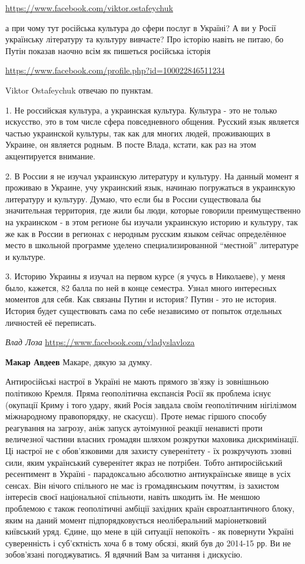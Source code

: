\begin{itemize}

\url{https://www.facebook.com/viktor.ostafeychuk}

а при чому тут російська культура до сфери послуг в Україні? А ви у Росії
українську літературу та культуру вивчаєте? Про історію навіть не питаю, бо
Путін показав наочно всім як пишеться російська історія

\url{https://www.facebook.com/profile.php?id=100022846511234}

Viktor Ostafeychuk отвечаю по пунктам.

1. Не российская культура, а украинская культура. Культура - это не только
искусство, это в том числе сфера повседневного общения. Русский язык является
частью украинской культуры, так как для многих людей, проживающих в Украине, он
является родным. В посте Влада, кстати, как раз на этом акцентируется внимание.

2. В России я не изучал украинскую литературу и культуру. На данный момент я
проживаю в Украине, учу украинский язык, начинаю погружаться в украинскую
литературу и культуру. Думаю, что если бы в России существовала бы значительная
территория, где жили бы люди, которые говорили преимущественно на украинском -
в этом регионе бы изучали украинскую историю и культуру, так же как в России в
регионах с неродным русским языком сейчас определённое место в школьной
программе уделено специализированной \enquote{местной} литературе и культуре.

3. Историю Украины я изучал на первом курсе (я учусь в Николаеве), у меня было,
кажется, 82 балла по ней в конце семестра. Узнал много интересных моментов для
себя. Как связаны Путин и история? Путин - это не история. История будет
существовать сама по себе независимо от попыток отдельных личностей её
переписать.

\emph{Влад Лоза}
\url{https://www.facebook.com/vladyslavloza}

\textbf{Макар Авдеев} Макаре, дякую за думку. 

Антиросійські настрої в Україні не мають прямого зв'язку із зовнішньою
політикою Кремля. Пряма геополітична експансія Росії як проблема існує
(окупації Криму і того удару, який Росія завдала своїм геополітичним нігілізмом
міжнародному правопорядку, не скасуєш). Проте немає гіршого способу реагування
на загрозу, аніж запуск аутоімунної реакції ненависті проти величезної частини
власних громадян шляхом розкрутки маховика дискримінації. Ці настрої не є
обов'язковими для захисту суверенітету - їх розкручують ззовні сили, яким
український суверенітет якраз не потрібен. Тобто антиросійський ресентимент в
Україні - парадоксально абсолютно антиукраїнське явище в усіх сенсах. Він
нічого спільного не має із громадянським почуттям, із захистом інтересів своєї
національної спільноти, навіть шкодить їм. Не меншою проблемою є також
геополітичні амбіції західних країн євроатлантичного блоку, яким на даний
момент підпорядковується неоліберальний маріонетковий київський уряд. Єдине, що
мене в цій ситуації непокоїть - як повернути Україні суверенність і
суб'єктність хоча б в тому обсязі, який був до 2014-15 рр.  Ви не зобов'язані
погоджуватись. Я вдячний Вам за читання і дискусію.


\end{itemize}
